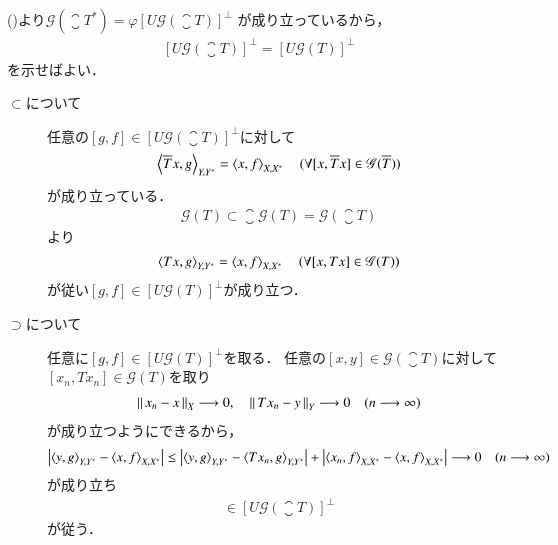	\begin{prf}
		()より$\mathscr{G}\left( \closure{T}^* \right) = \varphi\left[U\mathscr{G}(\closure{T}) \right]^{\perp}$
		が成り立っているから，
		\begin{align}
			\left[U\mathscr{G}(\closure{T}) \right]^{\perp} = \left[U\mathscr{G}(T) \right]^{\perp}
		\end{align}
		を示せばよい．
		\begin{description}
			\item[$\subset$について]
				任意の$[g,f] \in \left[U\mathscr{G}(\closure{T}) \right]^{\perp}$に対して
				\begin{align}
					\inprod<\closure{T}x, g>_{Y,Y^*} = \inprod<x,f>_{X,X^*} \quad (\forall [x,\closure{T}x] \in \mathscr{G}(\closure{T}))
				\end{align}
				が成り立っている．
				\begin{align}
					\mathscr{G}(T) \subset \closure{\mathscr{G}(T)} = \mathscr{G}(\closure{T})
				\end{align}
				より
				\begin{align}
					\inprod<Tx, g>_{Y,Y^*} = \inprod<x,f>_{X,X^*} \quad (\forall [x,Tx] \in \mathscr{G}(T))
				\end{align}
				が従い$[g,f] \in \left[U\mathscr{G}(T) \right]^{\perp}$が成り立つ．
			
			\item[$\supset$について]
				任意に$[g,f] \in \left[U\mathscr{G}(T) \right]^{\perp}$を取る．
				任意の$[x,y] \in \mathscr{G}(\closure{T})$に対して
				$[x_n,Tx_n] \in \mathscr{G}(T)$を取り
				\begin{align}
					\left\|\, x_n - x\, \right\|_{X} \longrightarrow 0, \quad
					\left\|\, Tx_n - y\, \right\|_{Y} \longrightarrow 0 \quad (n \longrightarrow \infty)
				\end{align}
				が成り立つようにできるから，
				\begin{align}
					\left| \inprod<y,g>_{Y,Y^*} - \inprod<x,f>_{X,X^*} \right|
					\leq \left| \inprod<y,g>_{Y,Y^*} - \inprod<Tx_n,g>_{Y,Y^*} \right|
						+ \left| \inprod<x_n,f>_{X,X^*} - \inprod<x,f>_{X,X^*} \right|
					\longrightarrow 0 \quad (n \longrightarrow \infty)
				\end{align}
				が成り立ち
				\begin{align}
					[g,f] \in \left[U\mathscr{G}(\closure{T}) \right]^{\perp}
				\end{align}
				が従う．
		\end{description}
		\QED
	\end{prf}
	
